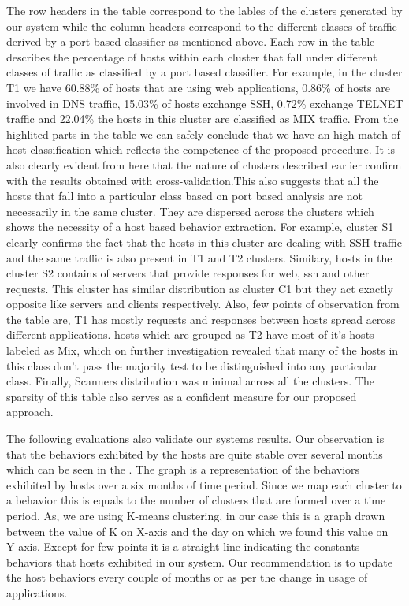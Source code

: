 The row headers in the table correspond to the lables of the clusters generated by our system while the column headers correspond to the different classes of traffic derived by a port based classifier as mentioned above. Each row in the table describes the percentage of hosts within each cluster that fall under different classes of traffic as classified by a port based classifier. For example, in the cluster T1 we have 60.88\% of hosts that are using web applications, 0.86\% of hosts are involved in DNS traffic, 15.03\% of hosts exchange SSH, 0.72\% exchange TELNET traffic and 22.04\% the hosts in this cluster are classified as MIX traffic.
From the highlited parts in the table we can safely conclude that 
we have an high match of host classification which reflects the competence of the proposed procedure. It is also clearly evident from here that the nature of clusters described earlier confirm with the results obtained with cross-validation.This also suggests that all the hosts that fall into a particular class based on port based analysis are not necessarily in the same cluster. They are dispersed across the clusters which shows the necessity of a host based behavior extraction. For example, cluster S1 clearly confirms the fact that the hosts in this cluster are dealing with SSH traffic and the same traffic is also present in T1 and T2 clusters. Similary, hosts in the cluster S2 contains of servers that provide responses for web, ssh and other requests. This cluster has similar distribution as cluster C1 but they act exactly opposite like servers and clients respectively. Also, few points of observation from the table are, T1 has mostly requests and responses between hosts spread across different applications. hosts which are grouped as T2 have most of it's hosts labeled as Mix, which on further investigation revealed that many of the hosts in this class don't pass the majority test to be distinguished into any particular class. Finally, Scanners distribution was minimal across all the clusters. The sparsity of this table also serves as a confident measure for our proposed approach.

The following evaluations also validate our systems results.
Our observation is that the behaviors exhibited by the hosts are quite stable over several months which can be seen in the  . The graph is a representation of the behaviors exhibited by hosts over a six months of time period. Since we map each cluster to a behavior this is equals to the number of clusters that are formed over a time period. As, we are using K-means clustering, in our case this is a graph drawn between the  value of K on X-axis and the day on which we found this value on Y-axis. Except for few points it is a straight line indicating the constants behaviors that hosts exhibited in our system. Our recommendation is to update the host behaviors every couple of months or as per the change in usage of applications.

